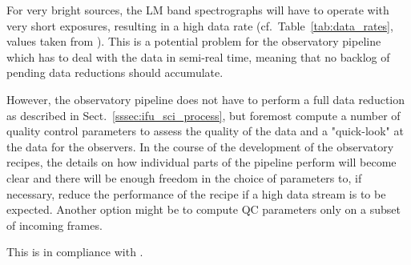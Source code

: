 For very bright sources, the LM band spectrographs will have to operate with very
short exposures, resulting in a high data rate (cf.~Table~\ref{tab:data_rates},
values taken from \cite{METIS-data_rates}).
This is a potential problem for the observatory pipeline which has to deal with
the data in semi-real time, meaning that no backlog of pending data
reductions should accumulate.

However, the observatory pipeline does not have to perform a full data reduction
as described in Sect.~\ref{sssec:ifu_sci_process}, but foremost compute a number
of quality control parameters to assess the quality of the data and a
"quick-look" at the data for the observers. In the course of the development of
the observatory recipes, the details on how individual parts of the pipeline
perform will become clear and there will be enough freedom in the choice of
parameters to, if necessary, reduce the performance of the recipe if a high data
stream is to be expected. Another option might be to compute QC parameters only
on a subset of incoming frames.

This is in compliance with .



